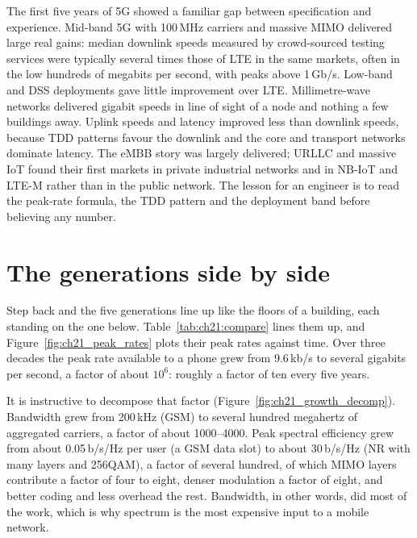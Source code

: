 \begin{inpractice}
The first five years of 5G showed a familiar gap between specification and experience. Mid-band 5G
with 100\,MHz carriers and massive MIMO delivered large real gains: median downlink speeds measured
by crowd-sourced testing services were typically several times those of LTE in the same markets,
often in the low hundreds of megabits per second, with peaks above 1\,Gb/s. Low-band and DSS
deployments gave little improvement over LTE. Millimetre-wave networks delivered gigabit speeds in
line of sight of a node and nothing a few buildings away. Uplink speeds and latency improved less
than downlink speeds, because TDD patterns favour the downlink and the core and transport networks
dominate latency. The eMBB story was largely delivered; URLLC and massive IoT found their first
markets in private industrial networks and in NB-IoT and LTE-M rather than in the public network. The
lesson for an engineer is to read the peak-rate formula, the TDD pattern and the deployment band
before believing any number.
\end{inpractice}

\section{The generations side by side}
\label{sec:ch21:compare}

Step back and the five generations line up like the floors of a building, each standing on the one
below. Table~\ref{tab:ch21:compare} lines them up, and Figure~\ref{fig:ch21_peak_rates} plots their
peak rates against time. Over three decades the peak rate available to a phone grew from 9.6\,kb/s
to several gigabits per second, a factor of about $10^6$: roughly a factor of ten every five years.

It is instructive to decompose that factor (Figure~\ref{fig:ch21_growth_decomp}). Bandwidth grew
from 200\,kHz (GSM) to several hundred megahertz of aggregated carriers, a factor of about
1000--4000. Peak spectral efficiency grew from about 0.05\,b/s/Hz per user (a GSM data slot) to
about 30\,b/s/Hz (NR with many layers and 256QAM), a factor of several hundred, of which MIMO layers
contribute a factor of four to eight, denser modulation a factor of eight, and better coding and less
overhead the rest. Bandwidth, in other words, did most of the work, which is why spectrum is the most
expensive input to a mobile network.

